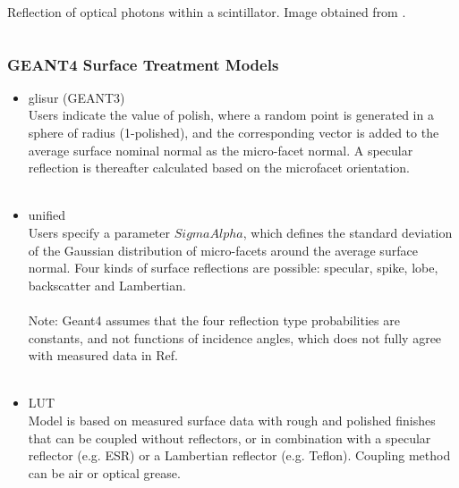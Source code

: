 \documentclass[xcolor=x11names, compress, handout]{beamer}
\renewcommand{\(}{\begin{columns}}
\renewcommand{\)}{\end{columns}}
\newcommand{\<}[1]{\begin{column}{#1}}
\renewcommand{\>}{\end{column}}
\begin{document}
\begin{frame}
\begin{columns}
\begin{column}{0.3\textwidth}
\begin{center}
  \scriptsize Reflection of optical photons within a scintillator. Image obtained from \cite{roncali_cherry_2013}.
  \end{center}
  \end{column}
  \end{columns}

\end{frame}

\begin{frame}
\frametitle{GEANT4 Surface Treatment Models  }
\scriptsize 
\begin{itemize}
\item glisur (GEANT3) \\
Users indicate the value of polish, where a random point is generated in a sphere of radius (1-polished), and the corresponding vector is added to the average surface nominal normal as the micro-facet normal. A specular reflection is thereafter calculated based on the microfacet orientation. \cite{geant4_doc} \cite{janecek_moses_2010} \\
\ \\

\item unified\\
 Users specify a parameter $SigmaAlpha$, which defines the standard deviation of the Gaussian distribution of micro-facets around the average surface normal. \cite{geant4_doc} Four kinds of surface reflections are possible: specular, spike, lobe, backscatter and Lambertian. \cite{janecek_moses_2010} \\
 \ \\

 Note: Geant4 assumes that the four reflection type probabilities are constants, and not functions of incidence angles, which does not fully agree with measured data in Ref. \cite{janecek_moses_2010} \\
 \ \\

\item LUT \\
Model is based on measured surface data with rough and polished finishes that can be coupled without reflectors, or in combination with a specular reflector (e.g. ESR) or a Lambertian reflector (e.g. Teflon). Coupling method can be air or optical grease. \cite{geant4_doc}
\end{itemize}
\end{frame}
\end{document}
